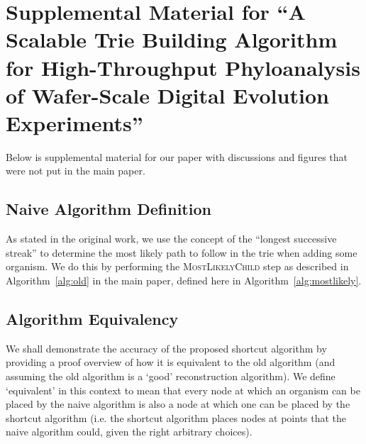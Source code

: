 \appendix
\section*{\Huge Supplemental Material for ``A Scalable Trie Building Algorithm for High-Throughput Phyloanalysis of Wafer-Scale Digital Evolution Experiments''}

\setcounter{section}{0}

\makeatletter
\def\@seccntformat#1{\@ifundefined{#1@cntformat}%
   {\csname the#1\endcsname\space}%
   {\csname #1@cntformat\endcsname}}%
\newcommand\section@cntformat{\thesection.\space} %
\makeatother
\renewcommand{\thesection}{S\arabic{section}}

\vspace{0.8em}

Below is supplemental material for our paper \citep{supplemental} with discussions and figures that were not put in the main paper.

\subsection{Naive Algorithm Definition}

\label{sec:algorithm:naivedefinition}

As stated in the original work, we use the concept of the ``longest successive streak'' \citep{moreno2024analysis} to determine the most likely path to follow in the trie when adding some organism.
We do this by performing the \textsc{MostLikelyChild} step as described in Algorithm~\ref{alg:old} in the main paper, defined here in Algorithm~\ref{alg:mostlikely}.



\subsection{Algorithm Equivalency}

\label{sec:algorithm:equivalency}

We shall demonstrate the accuracy of the proposed shortcut algorithm by providing a proof overview of how it is equivalent to the old algorithm (and assuming the old algorithm is a `good' reconstruction algorithm).
We define `equivalent' in this context to mean that every node at which an organism can be placed by the naive algorithm is also a node at which one can be placed by the shortcut algorithm (i.e. the shortcut algorithm places nodes at points that the naive algorithm could, given the right arbitrary choices).

